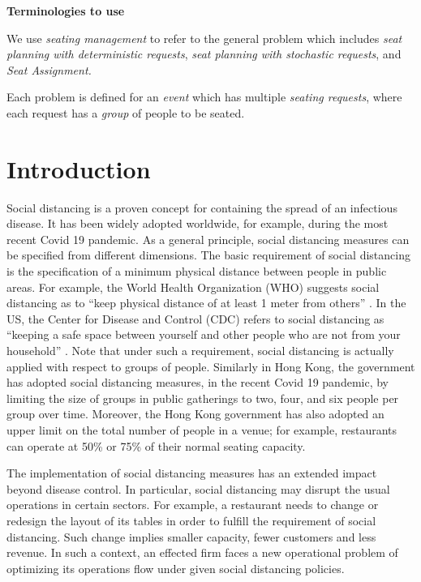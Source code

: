 

{\bf Terminologies to use}

We use {\em seating management} to refer to the general problem which includes {\em seat planning with deterministic requests}, 
{\em seat planning with stochastic requests}, and {\em Seat Assignment.}

Each problem is defined for an {\em event} which has multiple {\em seating  requests}, where each request has a {\em group} of people to be seated.


\section{Introduction}
Social distancing is a proven concept for containing the spread of an infectious disease. It has been widely adopted worldwide, for example, during the most recent Covid 19 pandemic. As a general principle, social distancing measures can be specified from different dimensions. The basic requirement of social distancing is the specification of a minimum physical distance between people in public areas. For example, the World Health Organization (WHO) suggests social distancing as to ``keep physical distance of at least 1 meter from others'' \cite{AdviceforPublic}. In the US, the Center for Disease and Control (CDC) refers to social distancing as ``keeping a safe space between yourself and other people who are not from your household'' \cite{CDC}. 
Note that under such a requirement, social distancing is actually applied with respect to groups of people. Similarly in Hong Kong, the government has adopted social distancing measures, in the recent Covid 19 pandemic, by limiting the size of groups in public gatherings to two, four, and six people per group over time. Moreover, the Hong Kong government has also adopted an upper limit on the total number of people in a venue; for example, restaurants can operate at 50\% or 75\% of their normal seating capacity. 


The implementation of social distancing measures has an extended impact beyond disease control. In particular, social distancing may disrupt the usual operations in certain sectors. For example, a restaurant needs to change or redesign the layout of its tables in order to fulfill the requirement of social distancing. Such change implies smaller capacity, fewer customers and less revenue. In such a context, an effected firm faces a new operational problem of optimizing its operations flow under given social distancing policies.


